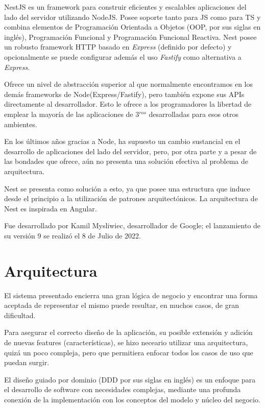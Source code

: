 \cite{nestjs_doc}
NestJS es un framework para construir eficientes y escalables aplicaciones del lado del servidor utilizando NodeJS. Posee soporte tanto para JS como para TS y combina elementos de Programación Orientada a Objetos (OOP, por sus siglas en inglés), Programación Funcional y Programación Funcional Reactiva. Nest posee un robusto framework HTTP basado en \textit{Express} (definido por defecto) y opcionalmente se puede configurar además el uso \textit{Fastify} como alternativa a \textit{Express}.

Ofrece un nivel de abstracción superior al que normalmente encontramos en los demás frameworks de Node(Express/Fastify), pero también expone sus APIs directamente al desarrollador. Esto le ofrece a los programadores la libertad de emplear la mayoría de las aplicaciones de 3$^{ros}$ desarrolladas para esos otros ambientes.

En los últimos años gracias a Node, ha supuesto un cambio sustancial en el desarrollo de aplicaciones del lado del servidor, pero, por otra parte y a pesar de las bondades que ofrece, aún no presenta una solución efectiva al problema de arquitectura. 

Nest se presenta como solución a esto, ya que posee una estructura que induce desde el principio a la utilización de patrones arquitectónicos. La arquitectura de Nest es inspirada en Angular.

Fue desarrollado por Kamil Mysliwiec, desarrollador de Google; el lanzamiento de su versión 9 se realizó el 8 de Julio de 2022.


\section{Arquitectura}

El  sistema presentado encierra una gran lógica de negocio y encontrar una forma aceptada de representar el mismo puede resultar, en muchos casos, de gran dificultad.

Para asegurar el correcto diseño de la aplicación, su posible extensión y adición de nuevas features (características), se hizo neceario utilizar una arquitectura, quizá un poco compleja, pero que permitiera enfocar todos los casos de uso que puedan surgir. 

El diseño guiado por dominio (DDD por sus siglas en inglés) es un enfoque para el desarrollo de software con necesidades complejas, mediante una profunda conexión de la implementación con los conceptos del modelo y núcleo del negocio.\cite{ddd_wiki} 

